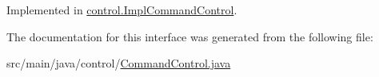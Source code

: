 Implemented in \mbox{\hyperlink{classcontrol_1_1_impl_command_control_a5736ac91cdc39805dc27c6af0c9935cb}{control.\+Impl\+Command\+Control}}.



The documentation for this interface was generated from the following file\+:\begin{DoxyCompactItemize}
\item 
src/main/java/control/\mbox{\hyperlink{_command_control_8java}{Command\+Control.\+java}}\end{DoxyCompactItemize}
